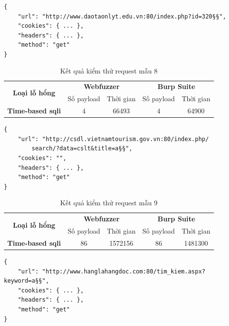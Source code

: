 \FloatBarrier
\begin{lstlisting}[style=ES6, label={lst:base-request-8}, caption={Request mẫu 8 có lỗ hổng time-based \acrshort{sqli}}]
{
    "url": "http://www.daotaonlyt.edu.vn:80/index.php?id=320§§",
    "cookies": { ... },
    "headers": { ... },
    "method": "get"
}
\end{lstlisting}
\FloatBarrier
\begin{table}[ht]
    \centering
    \caption{Kết quả kiểm thử request mẫu 8}
    \label{tab:testing-result-8}
    \begin{tabular}[ht]{ccccc}
        \toprule[1pt]\midrule[0.3pt]
            \multirow{2}{*}{\textbf{Loại lỗ hổng}}&\multicolumn{2}{c}{\textbf{Webfuzzer}}&\multicolumn{2}{c}{\textbf{Burp Suite}}\\
            \cmidrule(lr){2-3}\cmidrule(lr){4-5}{}&Số payload&Thời gian&Số payload&Thời gian\\
        \midrule[0.3pt]
            \textbf{Time-based \acrshort{sqli}}&4&66493&4&64900\\
        \midrule[0.3pt]\bottomrule[1pt]
    \end{tabular}
\end{table}
\FloatBarrier
\begin{lstlisting}[style=ES6, label={lst:base-request-9}, caption={Request mẫu 9 có lỗ hổng time-based \acrshort{sqli}}]
{
    "url": "http://csdl.vietnamtourism.gov.vn:80/index.php/
        search/?data=cslt&title=a§§",
    "cookies": "",
    "headers": { ... },
    "method": "get"
}
\end{lstlisting}
\FloatBarrier
\begin{table}[ht]
    \centering
    \caption{Kết quả kiểm thử request mẫu 9}
    \label{tab:testing-result-9}
    \begin{tabular}[ht]{ccccc}
        \toprule[1pt]\midrule[0.3pt]
            \multirow{2}{*}{\textbf{Loại lỗ hổng}}&\multicolumn{2}{c}{\textbf{Webfuzzer}}&\multicolumn{2}{c}{\textbf{Burp Suite}}\\
            \cmidrule(lr){2-3}\cmidrule(lr){4-5}{}&Số payload&Thời gian&Số payload&Thời gian\\
        \midrule[0.3pt]
            \textbf{Time-based \acrshort{sqli}}&86&1572156&86&1481300\\
        \midrule[0.3pt]\bottomrule[1pt]
    \end{tabular}
\end{table}
\FloatBarrier
\begin{lstlisting}[style=ES6, label={lst:base-request-10}, caption={Request mẫu 10 có lỗ hổng time-based \acrshort{sqli}}]
{
    "url": "http://www.hanglahangdoc.com:80/tim_kiem.aspx?keyword=a§§",
    "cookies": { ... },
    "headers": { ... },
    "method": "get"
}
\end{lstlisting}
